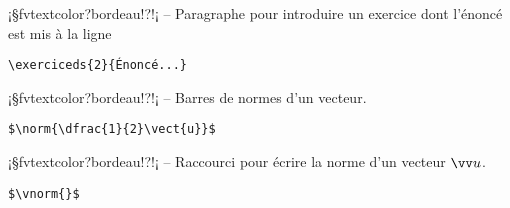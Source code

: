 \documentclass[11pt,a4paper,rgb]{report}
\begin{document}
\setlength{\leftskip}{0pt}
\setlength{\textwidth}{18cm}%


\vspace*{.75cm}

\inCodeStub¡§fvtextcolor?bordeau!?!¡ -- Paragraphe pour introduire un exercice dont l'énoncé est mis à la ligne

\setlength{\leftskip}{.75cm}%
\setlength{\textwidth}{17.25cm}%

\hfill
\begin{minipage}{.65\textwidth}
	\begin{lstlisting}[linewidth=\textwidth, language={[LaTeX]TeX}]
	\exerciceds{2}{Énoncé...}
	\end{lstlisting}
\end{minipage}

\setlength{\leftskip}{0pt}
\setlength{\textwidth}{18cm}%


\vspace*{.75cm}

\inCodeStub¡§fvtextcolor?bordeau!?!¡ -- Barres de normes d'un vecteur.

\setlength{\leftskip}{.75cm}%
\setlength{\textwidth}{17.25cm}%

\colorbox{blue!15}{}
\hfill
\begin{minipage}{.65\textwidth}
	\begin{lstlisting}[linewidth=\textwidth, language={[LaTeX]TeX}]
	$\norm{\dfrac{1}{2}\vect{u}}$
	\end{lstlisting}
\end{minipage}

\setlength{\leftskip}{0pt}
\setlength{\textwidth}{18cm}%


\vspace*{.75cm}

\inCodeStub¡§fvtextcolor?bordeau!?\vnorm{}!¡ -- Raccourci pour écrire la norme d'un vecteur $\vu$.

\setlength{\leftskip}{.75cm}%
\setlength{\textwidth}{17.25cm}%

\colorbox{blue!15}{}
\hfill
\begin{minipage}{.65\textwidth}
	\begin{lstlisting}[linewidth=\textwidth, language={[LaTeX]TeX}]
	$\vnorm{}$
	\end{lstlisting}
\end{minipage}
\end{document}
